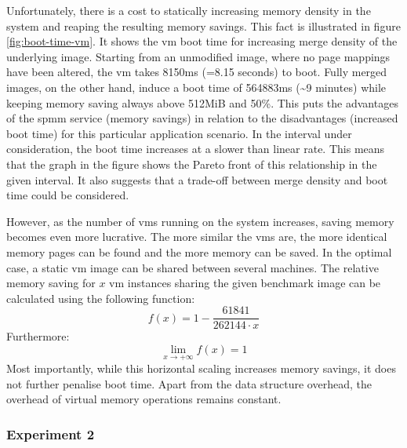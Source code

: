 Unfortunately, there is a cost to statically increasing memory density in the system and reaping the resulting memory savings.
This fact is illustrated in figure \ref{fig:boot-time-vm}.
It shows the \ac{vm} boot time for increasing merge density of the underlying image.
Starting from an unmodified image, where no page mappings have been altered, the \ac{vm} takes 8150ms (=8.15 seconds) to boot.
Fully merged images, on the other hand, induce a boot time of 564883ms (\textasciitilde{}9 minutes) while keeping memory saving always above 512MiB and 50\%.
This puts the advantages of the \ac{spmm} service (memory savings) in relation to the disadvantages (increased boot time) for this particular application scenario.
In the interval under consideration, the boot time increases at a slower than linear rate.
This means that the graph in the figure shows the Pareto front of this relationship in the given interval.
It also suggests that a trade-off between merge density and boot time could be considered.

However, as the number of \acp{vm} running on the system increases, saving memory becomes even more lucrative.
The more similar the \acp{vm} are, the more identical memory pages can be found and the more memory can be saved.
In the optimal case, a static \ac{vm} image can be shared between several machines.
The relative memory saving for $x$ \ac{vm} instances sharing the given benchmark image can be calculated using the following function:
$$f(x) = 1 - \frac{61841}{262144 \cdot x}$$
Furthermore:
$$ \lim_{x \to +\infty} f(x) = 1$$
Most importantly, while this horizontal scaling increases memory savings, it does not further penalise boot time.
Apart from the  data structure overhead, the overhead of virtual memory operations remains constant.

%  

\subsubsection*{Experiment 2}
\label{subsubsec:ex2}

